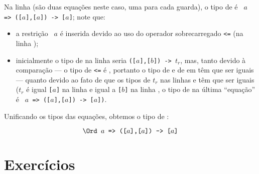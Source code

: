 \begin{enumerate}
Na linha  (são duas equações neste caso, uma para cada guarda),
o tipo de  é {\tt \Ord\ $a$ => ([$a$],[$a$]) -> [$a$]};
  note que:
  \begin{itemize}
    \item a restrição {\tt \Ord\ $a$} é inserida devido ao uso do
      operador sobrecarregado {\tt <=} (na linha );
    \item inicialmente o tipo de  na linha  seria
      {\tt ([$a$],[$b$]) -> $t_r$}, mas, tanto devido à comparação
       --- o tipo de {\tt <=} é
      ,
      portanto o tipo de  e de  em  têm que
      ser iguais --- quanto devido ao fato de que os tipos de $t_r$
      nas linhas  e  têm que ser iguais ($t_r$ é igual
      {\tt [$a$]} na linha  e igual a {\tt [$b$]} na linha
      , o tipo de  na última ``equação'' é
          {\tt \Ord\ $a$ => ([$a$],[$a$]) -> [$a$])}.
  \end{itemize}

  Unificando os tipos das equações, obtemos o tipo de :

    \[ \texttt{\Ord\ $a$ => ([$a$],[$a$]) -> [$a$]} \]

\end{enumerate}

\section{Exercícios}

